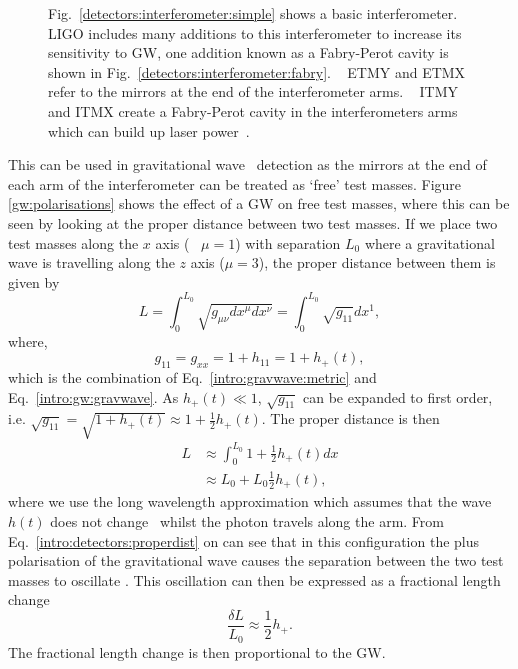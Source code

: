 \begin{figure}[hp]
    \caption[Basic layout of the \gls{LIGO}
detectors.]{Fig.~\ref{detectors:interferometer:simple} shows a basic
interferometer. \gls{LIGO} includes many additions to this interferometer to
increase its sensitivity to \gls{GW}, one addition known as a Fabry-Perot
cavity is shown in Fig.~\ref{detectors:interferometer:fabry}. ~ \gls{ETMY} and
\gls{ETMX} refer to the mirrors at the end of the interferometer arms.
~ \gls{ITMY} and \gls{ITMX} create a Fabry-Perot cavity in the interferometers
arms which can build up laser power~.}
\label{detectors:interferometer}
\end{figure}

This can be used in gravitational wave~ detection
as the mirrors at the end of each arm of the interferometer can be treated as
`free' test masses.  Figure \ref{gw:polarisations} shows the effect of a
\gls{GW} on free test masses, where this can be seen by looking at the proper
distance between two test masses.  If we place two test masses along the $x$
axis (~ $\mu = 1$) with separation $L_0$ where a gravitational wave is travelling
along the $z$ axis ($\mu = 3$), the proper distance between them is given by
%
\begin{equation}
    L = \int_{0}^{L_0} \sqrt{g_{\mu \nu} dx^{\mu} dx^{\nu}}= \int_{0}^{L_0} \sqrt{g_{11}} dx^1,
\end{equation}
%
where,
\begin{equation}
    \label{intro:detectors:metricpertubation}
     g_{11} = g_{xx} = 1 + h_{11} = 1 + h_{+}(t),
\end{equation}
which is the combination of Eq.~\ref{intro:gravwave:metric} and Eq.~\ref{intro:gw:gravwave}.  As $h_{+}(t) \ll 1$, $\sqrt{g_{11}}$ can be expanded to first order, i.e.  $\sqrt{g_{11}} = \sqrt{1 +
h_{+}(t)} \approx 1 + \frac{1}{2}h_{+}(t)$.  The proper distance is then
%
\begin{equation}
    \label{intro:detectors:properdist}
    \begin{split}
     L &\approx \int_{0}^{L_0} 1 + \frac{1}{2}h_{+}(t) dx \\
      &\approx L_0 + L_0 \frac{1}{2}h_{+}(t),
    \end{split}
\end{equation}
%
where we use the long wavelength approximation which assumes that the wave
$h(t)$ does not change~ whilst the photon travels along the arm.
From Eq.~\ref{intro:detectors:properdist} on can see that in this configuration the
plus polarisation of the gravitational wave causes the separation between the
two test masses to oscillate \citep{flanagan2005BasicsGravitational}.  This
oscillation can then be expressed as a fractional length change
%
\begin{equation}
    \label{intro:detectors:fraclength}
    \frac{\delta L}{L_0} \approx \frac{1}{2} h_{+}.
\end{equation}
%
The fractional length change is then proportional to the \gls{GW}.


